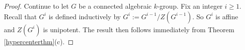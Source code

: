 \documentclass[10pt,a4paper]{amsart}
\begin{document}
\begin{proof} Continue to let $G$ be a connected algebraic $k$-group. Fix an integer $i\geq 1$. Recall that $G^i$ is defined inductively by $G^i:=G^{i-1}/Z(G^{i-1})$. %
So $G^i$ is affine and $Z(G^i)$ is unipotent. %
The result then follows immediately from Theorem \ref{hypercenterthm}(c).
\end{proof}
\end{document}
